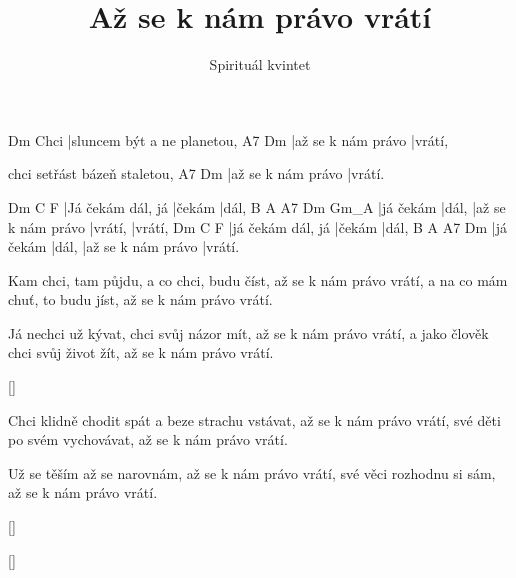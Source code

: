 \documentclass{song}
\title{Až se k nám právo vrátí}
\author{Spirituál kvintet}
\begin{document}
\strophe
     Dm
Chci |sluncem být a ne planetou,
A7                 Dm
|až se k nám právo |vrátí,

chci setřást bázeň staletou,
A7                 Dm
|až se k nám právo |vrátí.
\endstrophe

Dm                C      F
|Já čekám dál, já |čekám |dál,
B         A     A7                 Dm      Gm_A
|já čekám |dál, |až se k nám právo |vrátí, |vrátí,
Dm                C      F
|já čekám dál, já |čekám |dál,
B         A     A7                 Dm
|já čekám |dál, |až se k nám právo |vrátí.
\endstrophe

\strophe*
Kam chci, tam půjdu, a co chci, budu číst,
až se k nám právo vrátí,
a na co mám chuť, to budu jíst,
až se k nám právo vrátí.
\endstrophe

\strophe*
Já nechci už kývat, chci svůj názor mít,
až se k nám právo vrátí,
a jako člověk chci svůj život žít,
až se k nám právo vrátí.
\endstrophe

\ref{}

\strophe*
Chci klidně chodit spát a beze strachu vstávat,
až se k nám právo vrátí,
své děti po svém vychovávat,
až se k nám právo vrátí.
\endstrophe

\strophe*
Už se těším až se narovnám,
až se k nám právo vrátí,
své věci rozhodnu si sám,
až se k nám právo vrátí.
\endstrophe

\ref{}

\ref{}
\end{document}
